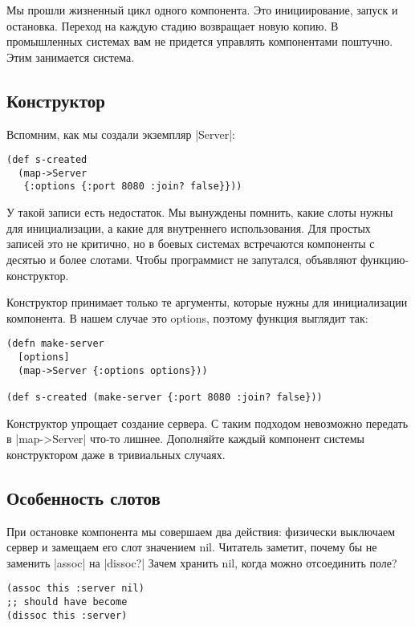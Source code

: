 Мы прошли жизненный цикл одного компонента. Это инициирование, запуск и
остановка. Переход на каждую стадию возвращает новую копию. В промышленных
системах вам не придется управлять компонентами поштучно. Этим занимается
система.

\subsection{Конструктор}

Вспомним, как мы создали экземпляр \spverb|Server|:

\begin{verbatim}
(def s-created
  (map->Server
   {:options {:port 8080 :join? false}}))
\end{verbatim}

У такой записи есть недостаток. Мы вынуждены помнить, какие слоты нужны для
инициализации, а какие для внутреннего использования. Для простых записей это не
критично, но в боевых системах встречаются компоненты с десятью и более
слотами. Чтобы программист не запутался, объявляют функцию-конструктор.

Конструктор принимает только те аргументы, которые нужны для инициализации
компонента. В нашем случае это options, поэтому функция выглядит так:

\begin{verbatim}
(defn make-server
  [options]
  (map->Server {:options options}))

(def s-created (make-server {:port 8080 :join? false}))
\end{verbatim}

Конструктор упрощает создание сервера. С таким подходом невозможно передать в
\spverb|map->Server| что-то лишнее. Дополняйте каждый компонент системы конструктором
даже в тривиальных случаях.

\subsection{Особенность слотов}

При остановке компонента мы совершаем два действия: физически выключаем сервер и
замещаем его слот значением nil. Читатель заметит, почему бы не заменить \spverb|assoc|
на \spverb|dissoc?| Зачем хранить nil, когда можно отсоединить поле?

\begin{verbatim}
(assoc this :server nil)
;; should have become
(dissoc this :server)
\end{verbatim}

